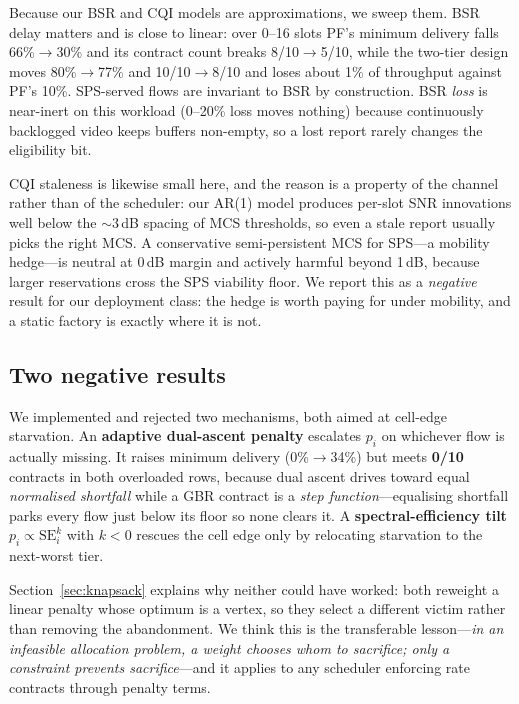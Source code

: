 \documentclass[conference]{IEEEtran}
\begin{document}
Because our BSR and CQI models are approximations, we sweep them. BSR delay
matters and is close to linear: over 0--16 slots PF's minimum delivery
falls 66\%$\to$30\% and its contract count breaks 8/10$\to$5/10, while the
two-tier design moves 80\%$\to$77\% and 10/10$\to$8/10 and loses about 1\%
of throughput against PF's 10\%. SPS-served flows are invariant to BSR by
construction. BSR \emph{loss} is near-inert on this workload (0--20\% loss
moves nothing) because continuously backlogged video keeps buffers
non-empty, so a lost report rarely changes the eligibility bit.

CQI staleness is likewise small here, and the reason is a property of the
channel rather than of the scheduler: our AR(1) model produces per-slot SNR
innovations well below the ${\sim}3$\,dB spacing of MCS thresholds, so even
a stale report usually picks the right MCS. A conservative semi-persistent
MCS for SPS---a mobility hedge---is neutral at 0\,dB margin and actively
harmful beyond 1\,dB, because larger reservations cross the SPS viability
floor. We report this as a \emph{negative} result for our deployment class:
the hedge is worth paying for under mobility, and a static factory is
exactly where it is not.

\subsection{Two negative results}\label{sec:negative}

We implemented and rejected two mechanisms, both aimed at cell-edge
starvation. An \textbf{adaptive dual-ascent penalty} escalates $p_i$ on
whichever flow is actually missing. It raises minimum delivery
(0\%$\to$34\%) but meets \textbf{0/10} contracts in both overloaded rows,
because dual ascent drives toward equal \emph{normalised shortfall} while a
GBR contract is a \emph{step function}---equalising shortfall parks every
flow just below its floor so none clears it. A
\textbf{spectral-efficiency tilt} $p_i \propto \mathrm{SE}_i^{k}$ with
$k<0$ rescues the cell edge only by relocating starvation to the next-worst
tier.

Section~\ref{sec:knapsack} explains why neither could have worked: both
reweight a linear penalty whose optimum is a vertex, so they select a
different victim rather than removing the abandonment. We think this is the
transferable lesson---\emph{in an infeasible allocation problem, a weight
chooses whom to sacrifice; only a constraint prevents sacrifice}---and it
applies to any scheduler enforcing rate contracts through penalty terms.
\end{document}
